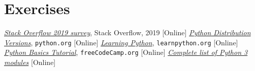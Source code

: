 \section{Exercises}


\begin{thebibliography}{9}
 \href{https://insights.stackoverflow.com/survey/2019}{\emph{Stack Overflow 2019 survey}}, Stack Overflow, 2019 [Online]
 \href{https://www.python.org/downloads/}{\emph{Python Distribution Versions}}, \texttt{python.org} [Online]
 \href{https://www.learnpython.org/it/}{\emph{Learning Python}}, \texttt{learnpython.org} [Online]
 \href{https://www.youtube.com/watch?v=8DvywoWv6fI}{\emph{Python Basics Tutorial}}, \texttt{freeCodeCamp.org} [Online]
 \href{https://docs.python.org/3/py-modindex.html}{\emph{Complete list of Python 3 modules}} [Online]
\end{thebibliography}
